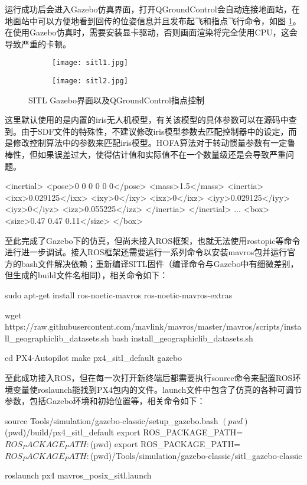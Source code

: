 运行成功后会进入Gazebo仿真界面，打开QGroundControl会自动连接地面站，在地面站中可以方便地看到回传的位姿信息并且发布起飞和指点飞行命令，如图 \ref{sitl}。在使用Gazebo仿真时，需要安装显卡驱动，否则画面渲染将完全使用CPU，这会导致严重的卡顿。
\begin{figure}[t]
  \centering
     \begin{subfigure}[c]{0.45\textwidth}
      \centering
      \texttt{[image: sitl1.jpg]}
   \end{subfigure}%
     \begin{subfigure}[c]{0.45\textwidth}
      \centering
      \texttt{[image: sitl2.jpg]}
   \end{subfigure}
   \caption{SITL Gazebo界面以及QGroundControl指点控制}
   \label{sitl}
 \end{figure}
 这里默认使用的是内置的iris无人机模型，有关该模型的具体参数可以在源码\cite{px4}中查到。由于SDF文件的特殊性，不建议修改iris模型参数去匹配控制器中的设定，而是修改控制算法中的参数来匹配iris模型。HOFA算法对于转动惯量参数有一定鲁棒性，但如果误差过大，使得估计值和实际值不在一个数量级还是会导致严重问题。
 \begin{codeblock}[language=C]
  <inertial>
    <pose>0 0 0 0 0 0</pose>
    <mass>1.5</mass>
    <inertia>
      <ixx>0.029125</ixx>
      <ixy>0</ixy>
      <ixz>0</ixz>
      <iyy>0.029125</iyy>
      <iyz>0</iyz>
      <izz>0.055225</izz>
    </inertia>
  </inertial>
...
<box>
  <size>0.47 0.47 0.11</size>
</box>
 \end{codeblock}

至此完成了Gazebo下的仿真，但尚未接入ROS框架，也就无法使用rostopic等命令进行进一步调试。接入ROS框架还需要运行一系列命令以安装mavros包并运行官方的bash文件解决依赖；重新编译SITL固件（编译命令与Gazebo中有细微差别，但生成的build文件名相同），相关命令如下：
\begin{codeblock}
  sudo apt-get install ros-noetic-mavros ros-noetic-mavros-extras

  wget https://raw.githubusercontent.com/mavlink/mavros/master/mavros/scripts/install_geographiclib_datasets.sh
  bash install_geographiclib_datasets.sh

  cd PX4-Autopilot
  make px4_sitl_default gazebo
\end{codeblock}

至此成功接入ROS，但在每一次打开新终端后都需要执行source命令来配置ROS环境变量使roslaunch能找到PX4包内的文件。launch文件中包含了仿真的各种可调节参数，包括Gazebo环境和初始位置等，相关命令如下：
\begin{codeblock}[language=C]
  source Tools/simulation/gazebo-classic/setup_gazebo.bash $(pwd) $(pwd)/build/px4_sitl_default
  export ROS_PACKAGE_PATH=$ROS_PACKAGE_PATH:$(pwd)
  export ROS_PACKAGE_PATH=$ROS_PACKAGE_PATH:$(pwd)/Tools/simulation/gazebo-classic/sitl_gazebo-classic

  roslaunch px4 mavros_posix_sitl.launch
\end{codeblock}

